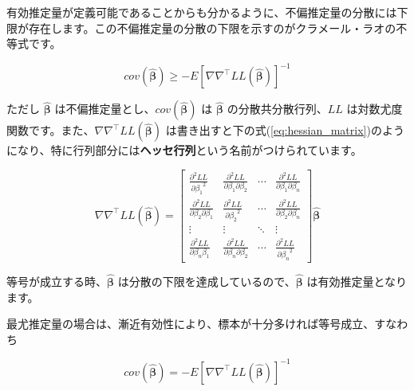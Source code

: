 有効推定量が定義可能であることからも分かるように、不偏推定量の分散には下限が存在します。この不偏推定量の分散の下限を示すのがクラメール・ラオの不等式です。

\begin{theorem}
    \begin{equation}
        cov(\bm{\hat\beta}) \ge -E\left[\nabla\nabla^\top LL(\bm{\hat\beta})\right]^{-1}
    \end{equation}
\end{theorem}

ただし $\bm{\hat\beta}$ は不偏推定量とし、$cov(\bm{\hat\beta})$ は $\bm{\hat\beta}$ の分散共分散行列、$LL$ は対数尤度関数です。また、$\nabla\nabla^\top LL(\bm{\hat\beta})$ は書き出すと下の式(\ref{eq:hessian_matrix})のようになり、特に行列部分には\textbf{ヘッセ行列}という名前がつけられています。

\begin{equation}
    \label{eq:hessian_matrix}
    \nabla\nabla^\top LL(\bm{\hat\beta}) = \begin{bmatrix}
        \frac{\partial^2 LL}{\partial {\beta_1}^2}              & \frac{\partial^2 LL}{\partial \beta_1 \partial \beta_2} & \cdots & \frac{\partial^2 LL}{\partial \beta_1 \partial \beta_n}  \\
        \frac{\partial^2 LL}{\partial \beta_2 \partial \beta_1} & \frac{\partial^2 LL}{\partial {\beta_2}^2}              & \cdots & \frac{\partial^2 LL}{\partial \beta_2 \partial \beta_n } \\
        \vdots                                                  & \vdots                                                  & \ddots & \vdots                                                   \\
        \frac{\partial^2 LL}{\partial \beta_n \beta_1}          & \frac{\partial^2 LL}{\partial \beta_n \partial \beta_2} & \cdots & \frac{\partial^2 LL}{\partial {\beta_n}^2}
    \end{bmatrix} \bm{\hat\beta}
\end{equation}

等号が成立する時、$\bm{\hat\beta}$ は分散の下限を達成しているので、$\bm{\hat\beta}$ は有効推定量となります。

最尤推定量の場合は、漸近有効性により、標本が十分多ければ等号成立、すなわち

\begin{equation}
    cov(\bm{\hat\beta}) = -E\left[\nabla\nabla^\top LL(\bm{\hat\beta})\right]^{-1}
\end{equation}

